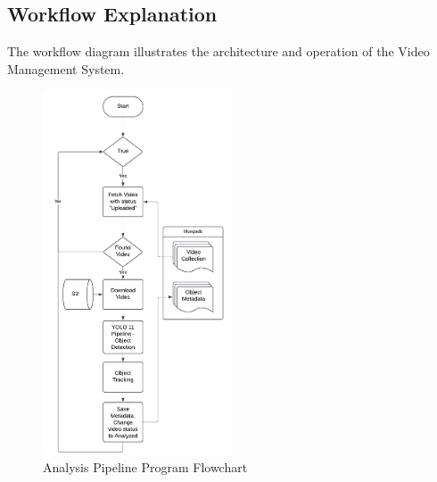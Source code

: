 \documentclass[conference]{IEEEtran}
\begin{document}
\subsection{Workflow Explanation}

The workflow diagram illustrates the architecture and operation of the Video Management System.
\begin{figure}[h!]
\centering
\includegraphics[width=0.5\textwidth]{analyze.png}
\caption{Analysis Pipeline Program Flowchart}
\label{fig:analyze_flow}
\end{figure}
\end{document}

